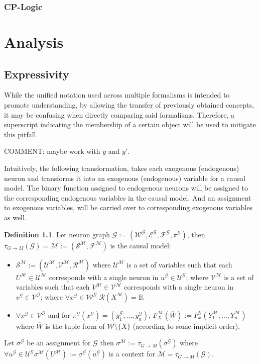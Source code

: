 \documentclass[11pt,a4paper]{book}
\theoremstyle{definition}
\newtheorem{definition}{Definition}[section]
\theoremstyle{definition}
\theoremstyle{definition}
\theoremstyle{remark}
\newcommand{\ngraph}{\mathcal{G}}
\newcommand{\cmodel}{\mathcal{M}}
\newcommand{\csig}{\mathcal{S}}
\newcommand{\cfoos}{\mathcal{F}}
\newcommand{\crange}{\mathcal{R}}
\newcommand{\cvars}{\mathcal{W}}
\newcommand{\cenvars}{\mathcal{V}}
\newcommand{\cexvars}{\mathcal{U}}
\newcommand{\crel}{\mathcal{E}}
\begin{document}
\subsection{CP-Logic}



\chapter{Analysis}

\section{Expressivity}


While the unified notation used across multiple formalisms is intended to promote understanding, by allowing the transfer of previously obtained concepts, it may be confusing when directly comparing said formalisms.
Therefore, a superscript indicating the membership of a certain object will be used to mitigate this pitfall. 


COMMENT: maybe work with $y$  and $y'$.


Intuitively, the following transformation, takes each exogenous (endogenous) neuron and transforms it into an exogenous (endogenous) variable for a causal model. The binary function assigned to endogenous neurons will be assigned to the corresponding endogenous variables in the causal model. And an assignment to exogenous variables, will be carried over to corresponding exogenous variables as well. 


\begin{definition}
Let neuron graph $\ngraph:=(\cvars^{\ngraph}, \crel^{\ngraph}, \cfoos^{\ngraph}, \pi^{\ngraph})$, then $\tau_{G\to M}(\ngraph)=\cmodel:=(\csig^{\cmodel}, \cfoos^{\cmodel})$ is the causal model:
\begin{itemize}
\item $\csig^{\cmodel}:=(\cexvars^{\cmodel}, \cenvars^{\cmodel}, \crange^{\cmodel})$ where $\cexvars^{\cmodel}$ is a set of variables such that each $U^{\cmodel} \in \cexvars^{\cmodel}$ corresponds with a single neuron in $u^{\ngraph} \in \cexvars^{\ngraph}$; where $\cenvars^{\cmodel}$ is a set of variables such that each $V^{\cmodel} \in \cenvars^{\cmodel}$ corresponds with a single neuron in $v^{\ngraph} \in \cenvars^{\ngraph}$; 
where $\forall x^{\ngraph} \in \cvars^{\ngraph} \; \crange(X^{\cmodel})=\mathbb{B}$.
\item $\forall x^{\ngraph} \in \cenvars^{\ngraph}$ and for  $\pi^{\ngraph}(x^{\ngraph})=(y_1^{\ngraph}, \dots, y_n^{\ngraph} )$,  $F_{X}^{\cmodel}(\overline{W}):= F_{x}^{\ngraph}(Y_1^{\cmodel} , \dots , Y_n^{\cmodel})$ 
where $\overline{W}$ is the tuple form of $\cvars \setminus \{X\}$ (according to some implicit order).
\end{itemize}
Let $\sigma^{\ngraph}$ be an assignment for $\ngraph$ then $\sigma^{\cmodel} := \tau_{G\to M}(\sigma^{\ngraph})$ where $\forall u^{\ngraph} \in \cexvars^{\ngraph} \sigma^{\cmodel}(U^{\cmodel}):=\sigma^{\ngraph}(u^{\ngraph})$ is a context for $ \cmodel=\tau_{G\to M}(\ngraph)$.
\end{definition}
\end{document}
